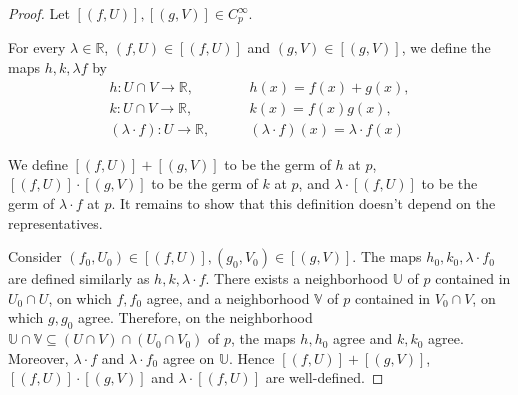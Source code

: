 \begin{proof}
    Let \( [(f, U)], [(g, V)] \in C^{\infty}_{p} \).

    For every \( \lambda \in \mathbb{R} \), \( (f, U) \in [(f, U)] \) and \( (g, V) \in [(g, V)] \), we define the maps \( h, k, \lambda f \) by
    \begin{align*}
        h: U \cap V \to \mathbb{R},         & \qquad h(x) = f(x) + g(x),                      \\
        k: U \cap V \to \mathbb{R},         & \qquad k(x) = f(x)g(x),                         \\
        (\lambda\cdot f): U \to \mathbb{R}, & \qquad (\lambda\cdot f)(x) = \lambda \cdot f(x)
    \end{align*}

    We define \( [(f, U)] + [(g, V)] \) to be the germ of \( h \) at \( p \), \(  [(f, U)]\cdot [(g, V)] \) to be the germ of \( k \) at \( p \), and \( \lambda\cdot [(f, U)] \) to be the germ of \( \lambda\cdot f \) at \( p \). It remains to show that this definition doesn't depend on the representatives.

    Consider \( (f_{0}, U_{0}) \in [(f, U)], (g_{0}, V_{0}) \in [(g, V)] \). The maps \( h_{0}, k_{0}, \lambda\cdot f_{0} \) are defined similarly as \( h, k, \lambda\cdot f \). There exists a neighborhood \( \mathbb{U} \) of \( p \) contained in \( U_{0} \cap U \), on which \( f, f_{0} \) agree, and a neighborhood \( \mathbb{V} \) of \( p \) contained in \( V_{0} \cap V \), on which \( g, g_{0} \) agree. Therefore, on the neighborhood \( \mathbb{U} \cap \mathbb{V} \subseteq (U \cap V) \cap (U_{0} \cap V_{0}) \) of \( p \), the maps \( h, h_{0} \) agree and \( k, k_{0} \) agree. Moreover, \( \lambda\cdot f \) and \( \lambda\cdot f_{0} \) agree on \( \mathbb{U} \). Hence \( [(f, U)] + [(g, V)] \), \( [(f, U)] \cdot [(g, V)] \) and \( \lambda\cdot[(f, U)] \) are well-defined.


\end{proof}
